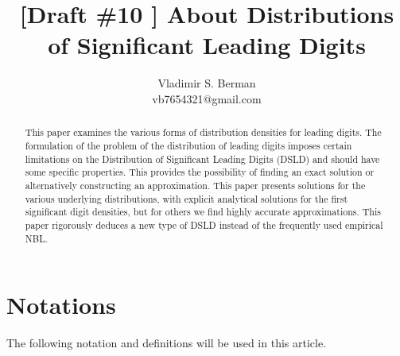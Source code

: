\documentclass[titlepage,fleqn]{article}%
\begin{document}
\title{[Draft \#10 ] About Distributions of Significant Leading Digits}
\author{Vladimir S. Berman\\vb7654321@gmail.com}
\maketitle

\begin{abstract}
This paper examines the various forms of distribution densities for leading
digits. The formulation of the problem of the distribution of leading digits
imposes certain limitations on the Distribution of Significant Leading Digits
(DSLD) and should have some specific properties. This provides the possibility
of finding an exact solution or alternatively constructing an approximation.
This paper presents solutions for the various underlying distributions, with
explicit analytical solutions for the first significant digit densities, but
for others we find highly accurate approximations. This paper rigorously
deduces a new type of DSLD instead of the frequently used empirical NBL.

\end{abstract}
\tableofcontents
\listoffigures
\listoftables

\section{Notations}

The following notation and definitions will be used in this article.%
\end{document}
